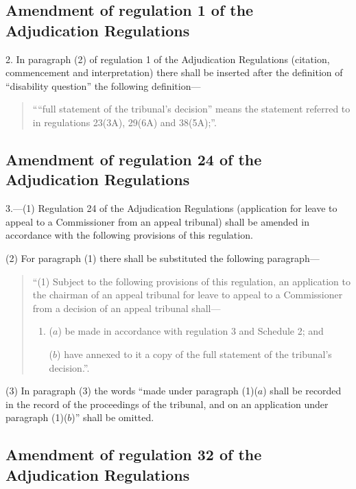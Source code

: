 \documentclass[12pt,a4paper]{article}
\begin{document}
\subsection[2. Amendment of regulation 1 of the Adjudication Regulations]{Amendment of regulation 1 of the Adjudication Regulations}

2.  In paragraph (2) of regulation 1 of the Adjudication Regulations (citation, commencement and interpretation) there shall be inserted after the definition of “disability question” the following definition—
\begin{quotation}
““full statement of the tribunal’s decision” means the statement referred to in regulations 23(3A), 29(6A) and 38(5A);”.
\end{quotation}

\subsection[3. Amendment of regulation 24 of the Adjudication Regulations]{Amendment of regulation 24 of the Adjudication Regulations}

3.—(1) Regulation 24 of the Adjudication Regulations (application for leave to appeal to a Commissioner from an appeal tribunal) shall be amended in accordance with the following provisions of this regulation.

(2) For paragraph (1) there shall be substituted the following paragraph—
\begin{quotation}
“(1) Subject to the following provisions of this regulation, an application to the chairman of an appeal tribunal for leave to appeal to a Commissioner from a decision of an appeal tribunal shall—
\begin{enumerate}\item[]
($a$) be made in accordance with regulation 3 and Schedule 2; and

($b$) have annexed to it a copy of the full statement of the tribunal’s decision.”.
\end{enumerate}
\end{quotation}

(3) In paragraph (3) the words “made under paragraph (1)($a$) shall be recorded in the record of the proceedings of the tribunal, and on an application under paragraph (1)($b$)” shall be omitted.

\subsection[4. Amendment of regulation 32 of the Adjudication Regulations]{Amendment of regulation 32 of the Adjudication Regulations}
\end{document}
